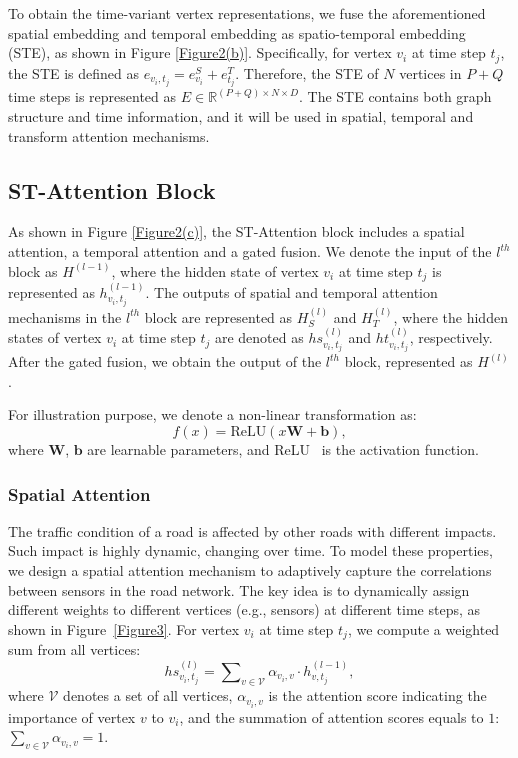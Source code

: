 \documentclass[letterpaper]{article} \usepackage{aaai20}  \usepackage{times}  \usepackage{helvet} \usepackage{courier}  \usepackage[hyphens]{url}  \usepackage{graphicx} \usepackage{amsmath}
\begin{document}
To obtain the time-variant vertex representations, we fuse the aforementioned spatial embedding and temporal embedding as spatio-temporal embedding (STE), as shown in Figure \ref{Figure2(b)}. Specifically, for vertex $ v_i $ at time step $ t_j $, the STE is defined as $ e_{v_i, t_j} = e^S_{v_{i}}  + e^T_{t_{j}} $. Therefore, the STE of $ N $ vertices in $ P + Q $ time steps is represented as $ E \in \mathbb{R}^{ (P + Q) \times N \times D} $. The STE contains both graph structure and time information, and it will be used in spatial, temporal and transform attention mechanisms. 

\subsection{ST-Attention Block}

As shown in Figure \ref{Figure2(c)}, the ST-Attention block includes a spatial attention, a temporal attention and a gated fusion. We denote the input of the $ l^{th} $ block as $ H^{(l-1)} $, where the hidden state of vertex $ v_i $ at time step $ t_j $ is represented as $ h_{v_i,t_j}^{(l-1)} $. The outputs of spatial and temporal attention mechanisms in the $ l^{th} $ block are represented as $ H_S^{(l)} $ and $ H_T^{(l)} $, where the hidden states of vertex $ v_i $ at time step $ t_j $ are denoted as $ hs_{v_i,t_j}^{(l)} $ and $ ht_{v_i,t_j}^{(l)} $, respectively. After the gated fusion, we obtain the output of the $ l^{th} $ block, represented as $ H^{(l)} $.

For illustration purpose, we denote a non-linear transformation as:
\begin{equation}
f(x) = \mathrm{ReLU} ( x \mathbf{W} + \mathbf{b} ) 
\label{non-linear transform},
\end{equation}
where $ \mathbf{W} $, $ \mathbf{b} $ are learnable parameters, and ReLU~\cite{Nair-and-Hinton:ICML2010} is the activation function.

\subsubsection{Spatial Attention}

The traffic condition of a road is affected by other roads with different impacts. Such impact is highly dynamic, changing over time. To model these properties, we design a spatial attention mechanism to adaptively capture the correlations between sensors in the road network. The key idea is to dynamically assign different weights to different vertices (e.g., sensors) at different time steps, as shown in Figure~\ref{Figure3}. For vertex $ v_i $ at time step $ t_j $, we compute a weighted sum from all vertices:
\begin{equation}
hs_{v_i,t_j}^{(l)} = \sum\nolimits_{v \in \mathcal{V}} \alpha_{v_i,v} \cdot h_{v,t_j}^{(l-1)} \label{spatial attention3},
\end{equation}
where $ \mathcal{V} $ denotes a set of all vertices, $ \alpha_{v_i,v} $ is the attention score indicating the importance of vertex $ v $ to $ v_i $, and the summation of attention scores equals to $ 1 $: $ \sum\nolimits_{v \in \mathcal{V}} \alpha_{v_i,v} = 1 $. 
\end{document}
